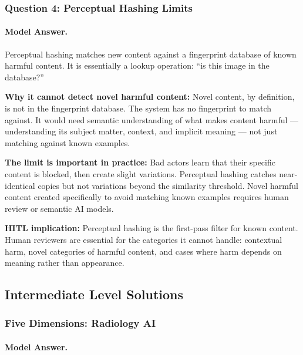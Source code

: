 \subsubsection{Question 4: Perceptual Hashing Limits}

\paragraph{Model Answer.}

Perceptual hashing matches new content against a fingerprint database of known harmful content. It is essentially a lookup operation: ``is this image in the database?''

\textbf{Why it cannot detect novel harmful content:} Novel content, by definition, is not in the fingerprint database. The system has no fingerprint to match against. It would need semantic understanding of what makes content harmful --- understanding its subject matter, context, and implicit meaning --- not just matching against known examples.

\textbf{The limit is important in practice:} Bad actors learn that their specific content is blocked, then create slight variations. Perceptual hashing catches near-identical copies but not variations beyond the similarity threshold. Novel harmful content created specifically to avoid matching known examples requires human review or semantic AI models.

\textbf{HITL implication:} Perceptual hashing is the first-pass filter for known content. Human reviewers are essential for the categories it cannot handle: contextual harm, novel categories of harmful content, and cases where harm depends on meaning rather than appearance.

\subsection{Intermediate Level Solutions}

\subsubsection{Five Dimensions: Radiology AI}

\paragraph{Model Answer.}


